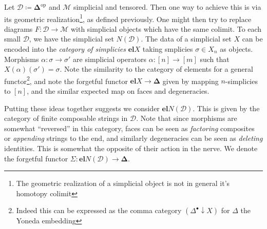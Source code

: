 Let $\mathcal{D} \coloneqq \boldsymbol{\Delta} ^{\mathrm{op}} $ and $\mathcal{M} $ simplicial and tensored. Then one way to achieve this is via its geometric realization\footnote{The geometric realization of a simplicial object is not in general it's homotopy colimit}, as defined previously. One might then try to replace diagrams $F : \mathcal{D}  \to \mathcal{M} $ with simplicial objects which have the same colimit. To each small $\mathcal{D} $, we have the simplicial set $N(\mathcal{D} )$. The data of a simplicial set $X$ can be encoded into the \emph{category of simplicies} $\mathbf{el} X$ taking smplicies $\sigma\in X_n$ as objects. Morphisms $\alpha : \sigma \to \sigma'$ are simplicial operators $\alpha : [n] \to [m]$ such that $X(\alpha)(\sigma')=\sigma$. Note the similarity to the category of elements for a general functor\footnote{Indeed this can be expressed as the comma category $(\Delta^{\bullet} \downarrow X)$ for $\Delta$ the Yoneda embedding}, and note the forgetful functor $\mathbf{el} X\to \boldsymbol{\Delta} $ given by mapping $n$-simplicies to $[n]$, and the similar expected map on faces and degeneracies.

Putting these ideas together suggests we consider $\mathbf{el} N(\mathcal{D} )$. This is given by the category of finite composable strings in $\mathcal{D} $. Note that since morphisms are somewhat ``reversed'' in this category, faces can be seen as \emph{factoring} composites or \emph{appending} strings to the end, and similarly degeneracies can be seen as \emph{deleting} identities. This is somewhat the opposite of their action in the nerve. We denote the forgetful functor $\Sigma : \mathbf{el} N(\mathcal{D} ) \to \boldsymbol{\Delta} $.

